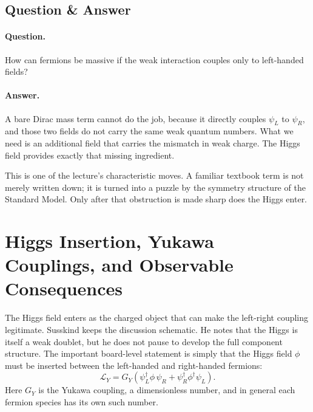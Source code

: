 \subsection{Question \& Answer}

\paragraph{Question.} How can fermions be massive if the weak interaction couples only to left-handed fields?

\paragraph{Answer.} A bare Dirac mass term cannot do the job, because it directly couples \(\psi_L\) to \(\psi_R\), and those two fields do not carry the same weak quantum numbers. What we need is an additional field that carries the mismatch in weak charge. The Higgs field provides exactly that missing ingredient.

This is one of the lecture's characteristic moves. A familiar textbook term is not merely written down; it is turned into a puzzle by the symmetry structure of the Standard Model. Only after that obstruction is made sharp does the Higgs enter.

\section{Higgs Insertion, Yukawa Couplings, and Observable Consequences}

The Higgs field enters as the charged object that can make the left-right coupling legitimate. Susskind keeps the discussion schematic. He notes that the Higgs is itself a weak doublet, but he does not pause to develop the full component structure. The important board-level statement is simply that the Higgs field \(\phi\) must be inserted between the left-handed and right-handed fermions:
\begin{equation}
\mathcal{L}_Y
=
G_Y\left(\psi_L^\dagger \phi\,\psi_R+\psi_R^\dagger \phi^\dagger \psi_L\right).
\end{equation}
Here \(G_Y\) is the Yukawa coupling, a dimensionless number, and in general each fermion species has its own such number.

